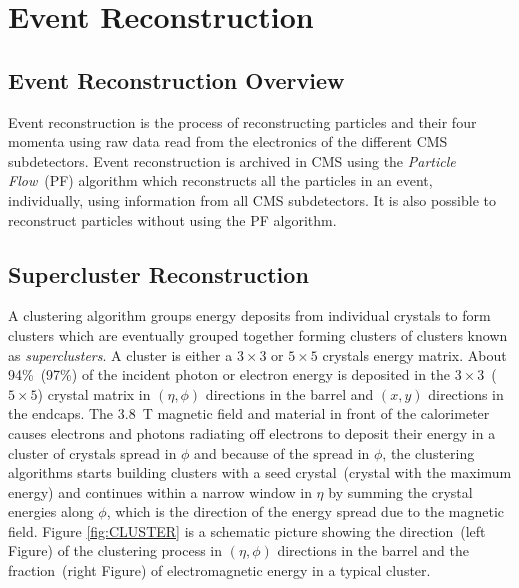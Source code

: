 \chapter{Event Reconstruction}
\section{Event Reconstruction Overview}
Event reconstruction is the process of reconstructing particles and their four momenta using raw data read from the electronics of the different CMS subdetectors. Event reconstruction is archived in CMS  using the \textit{Particle Flow}~(PF) algorithm which reconstructs all the particles in an event, individually, using information from all CMS subdetectors. It is also possible to reconstruct particles without using the PF algorithm.%

\section{Supercluster Reconstruction}
A clustering algorithm groups energy deposits from individual crystals to form clusters which are eventually grouped together forming  clusters of clusters known as \textit{superclusters}. A cluster is either a $3\times3$ or $5\times5$ crystals energy matrix. About 94\%~(97\%) of the incident photon or electron energy is deposited in the $3\times3$~($5\times5$) crystal matrix in $(\eta, \phi)$ directions in the barrel and $(x,y)$ directions in the endcaps. 
\newline
The $3.8$~T magnetic field and material in front of the calorimeter causes electrons and photons radiating off electrons to deposit their energy in a cluster of crystals spread in $\phi$ and because of the spread in $\phi$,  the clustering algorithms starts building clusters with a seed crystal~(crystal with the maximum energy) and continues within a narrow window in $\eta$ by summing the crystal energies along $\phi$, which is the direction of the energy spread due to the magnetic field. Figure \ref{fig:CLUSTER} is a schematic picture showing the direction~(left Figure) of the clustering process in $(\eta,\phi)$ directions in the barrel  and the fraction~(right Figure) of electromagnetic energy in a typical cluster.

